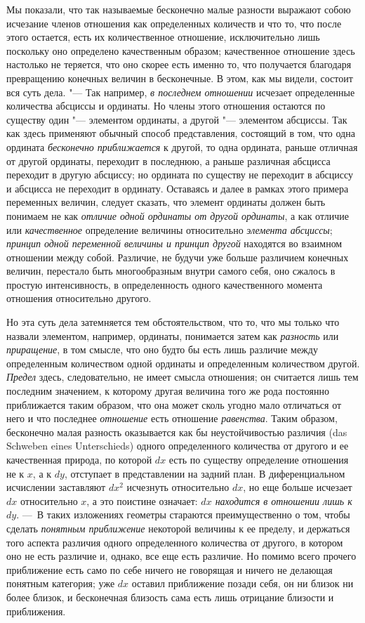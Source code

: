 {Мы показали, что так называемые бесконечно малые разности выражают собою
исчезание членов отношения как определенных количеств и что то, что после
этого остается, есть их количественное отношение, исключительно лишь
поскольку оно определено качественным образом; качественное отношение здесь
настолько не теряется, что оно скорее есть именно то, что получается
благодаря превращению конечных величин в бесконечные. В этом, как мы
видели, состоит вся суть дела. "--- Так например, {\em в
последнем отношении} исчезает определенные количества абсциссы и ординаты.
Но члены этого отношения остаются по существу один "--- элементом ординаты,
а другой "--- элементом абсциссы. Так как здесь применяют обычный способ
представления, состоящий в том, что одна ордината
{\em бесконечно приближается} к другой, то одна
ордината, раньше отличная от другой ординаты, переходит в последнюю, а
раньше различная абсцисса переходит в другую абсциссу; но ордината по
существу не переходит в абсциссу и абсцисса не переходит в ординату.
Оставаясь и далее в рамках этого примера переменных величин, следует
сказать, что элемент ординаты должен быть понимаем не как
{\em отличие одной ординаты от другой ординаты}, а как
отличие или {\em качественное} определение величины
относительно {\em элемента абсциссы};
{\em принцип одной переменной величины и принцип
другой} находятся во взаимном отношении между собой. Различие, не будучи
уже больше различием конечных величин, перестало быть многообразным внутри
самого себя, оно сжалось в простую интенсивность, в определенность одного
качественного момента отношения относительно другого.

Но эта суть дела затемняется тем обстоятельством, что то, что мы только что
назвали элементом, например, ординаты, понимается затем как
{\em разность} или
{\em приращение}, в том смысле, что оно будто бы есть
лишь различие между определенным количеством одной ординаты и определенным
количеством другой. {\em Предел} здесь, следовательно,
не имеет смысла отношения; он считается лишь тем последним значением, к
которому другая величина того же рода постоянно приближается таким образом,
что она может сколь угодно мало отличаться от него и что последнее
{\em отношение} есть отношение
{\em равенства}. Таким образом, бесконечно малая
разность оказывается как бы неустойчивостью различия (das Schweben eines
Unterschieds) одного определенного количества от другого и ее качественная
природа, по которой $dx$ есть по существу
определение отношения не к $x$, а к
$dy$, отступает в представлении на задний план. В
диференциальном исчислении заставляют
$dx^2$ исчезнуть относительно
$dx$, но еще больше исчезает $dx$ относительно $x$, а
это поистине означает: {\em $dx$ находится в отношении
лишь к $dy$}. ---~В таких изложениях геометры стараются преимущественно
о том, чтобы сделать {\em понятным приближение} некоторой
величины к ее пределу, и держаться того аспекта различия одного
определенного количества от другого, в котором оно не есть различие и,
однако, все еще есть различие. Но помимо всего прочего приближение есть
само по себе ничего не говорящая и ничего не делающая понятным категория;
уже $dx$ оставил приближение позади себя, он ни
близок ни более близок, и бесконечная близость сама есть лишь отрицание
близости и приближения.

}
